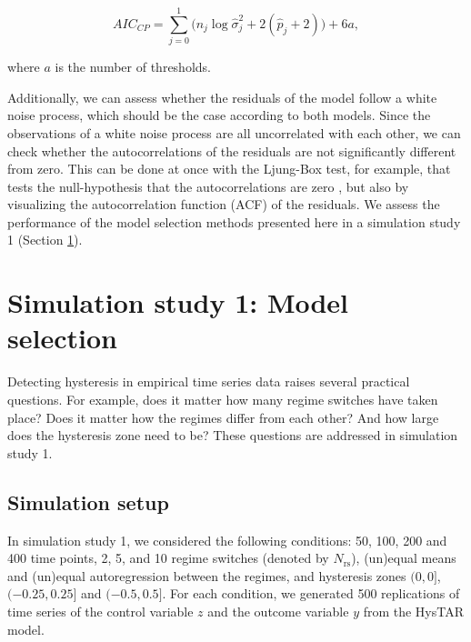 \documentclass{article}
\begin{document}
\begin{equation}
\label{eq:aiccp}
AIC_{CP} = \sum_{j = 0}^{1} \Big(n_j \log \hat{\sigma}_{j}^2 + 2(\hat{p}_j + 2) \Big) + 6a,
\end{equation}

\noindent where $a$ is the number of thresholds.

Additionally, we can assess whether the residuals of the model follow a white noise process, which should be the case according to both models.
Since the observations of a white noise process are all uncorrelated with each other, we can check whether the autocorrelations of the residuals are not significantly different from zero.
This can be done at once with the Ljung-Box test, for example, that tests the null-hypothesis that the autocorrelations are zero \citep{ljungbox}, but also by visualizing the autocorrelation function (ACF) of the residuals.
We assess the performance of the model selection methods presented here in a simulation study 1 (Section \ref{sec:simulation_study_1}).

\section{Simulation study 1: Model selection}
\label{sec:simulation_study_1}
Detecting hysteresis in empirical time series data raises several practical questions.
For example, does it matter how many regime switches have taken place?
Does it matter how the regimes differ from each other?
And how large does the hysteresis zone need to be?
These questions are addressed in simulation study 1.

\subsection{Simulation setup}
In simulation study 1, we considered the following conditions: 50, 100, 200 and 400 time points, 2, 5, and 10 regime switches (denoted by $N_{\mathrm{rs}}$), (un)equal means and (un)equal autoregression between the regimes, and hysteresis zones $(0, 0]$, $(-0.25, 0.25]$ and $(-0.5, 0.5]$. For each condition, we generated 500 replications of time series of the control variable $z$ and the outcome variable $y$ from the HysTAR model.
\end{document}
